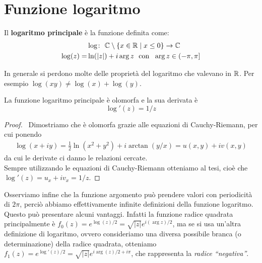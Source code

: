 \section{Funzione logaritmo}
	
	\begin{definition}
		\label{defn:logaritmo-principale}
		Il \textbf{logaritmo principale} è la funzione definita come:
		\begin{equation}
		\begin{aligned}	
			 & \log \colon\ \mathbb{C} \setminus \{x \in \mathbb{R} \mid x \le 0\} \rightarrow \mathbb{C} \\
			 \log(z) = & \ln(|z|) + i\arg z \ \text{  con  } \ \arg z \in (-\pi,\pi]
		\end{aligned}
		\end{equation}
		
	\end{definition}

	\begin{remark}
		In generale si perdono molte delle proprietà del logaritmo che valevano in $\mathbb{R}$. Per esempio $\log(xy) \neq \log(x)+\log(y)$.
	\end{remark}

	\begin{theorem}
		La funzione logaritmo principale è olomorfa e la sua derivata è 
		\begin{equation*}
			\log'(z) = 1/z
		\end{equation*}
	\end{theorem}
	\begin{proof} \
		Dimostriamo che è olomorfa grazie alle equazioni di Cauchy-Riemann, per cui ponendo
		\begin{equation*}
		\begin{aligned}
			\log(x+iy) = \frac{1}{2}\ln(x^2 + y^2) + i\arctan(y/x) = u(x,y) + iv(x,y)
		\end{aligned}
		\end{equation*}
		da cui le derivate ci danno le relazioni cercate.\\
		
		Sempre utilizzando le equazioni di Cauchy-Riemann otteniamo al tesi, cioè che $\log'(z) = u_x + iv_x = 1/z$.
	\end{proof}
	\begin{remark}
		Osserviamo infine che la funzione argomento può prendere valori con periodicità di $2\pi$, perciò abbiamo effettivamente infinite definizioni della funzione logaritmo. \\ Questo può presentare alcuni vantaggi. Infatti la funzione radice quadrata principalmente è 
		$f_0(z) = e^{\log(z)/2} = \sqrt{|z|}e^{i(\arg z)/2}$, ma se si usa un'altra definizione di logaritmo, ovvero consideriamo una diversa possibile branca (o determinazione) della radice quadrata, otteniamo $f_1(z) = e^{\log'(z)/2} = \sqrt{|z|}e^{i\arg(z)/2 + i\pi}$, che rappresenta la \textit{radice ``negativa''}. 
	\end{remark}
